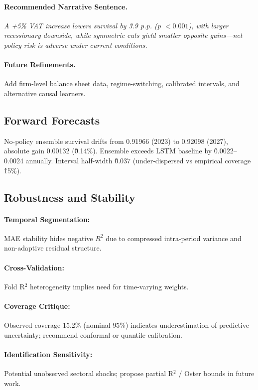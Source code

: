 \paragraph{Recommended Narrative Sentence.} \textit{A +5\% VAT increase lowers survival by \~3.9 p.p. (p $<0.001$), with larger recessionary downside, while symmetric cuts yield smaller opposite gains—net policy risk is adverse under current conditions.}

\paragraph{Future Refinements.} Add firm-level balance sheet data, regime-switching, calibrated intervals, and alternative causal learners.


\subsection{Forward Forecasts}
No-policy ensemble survival drifts from 0.91966 (2023) to 0.92098 (2027), absolute gain 0.00132 (\~0.14\%). Ensemble exceeds LSTM baseline by \~0.0022--0.0024 annually. Interval half-width \~0.037 (under-dispersed vs empirical coverage \~15\%).

\subsection{Robustness and Stability}
\paragraph{Temporal Segmentation:} MAE stability hides negative $R^2$ due to compressed intra-period variance and non-adaptive residual structure.
\paragraph{Cross-Validation:} Fold R$^2$ heterogeneity implies need for time-varying weights.
\paragraph{Coverage Critique:} Observed coverage 15.2\% (nominal 95\%) indicates underestimation of predictive uncertainty; recommend conformal or quantile calibration.
\paragraph{Identification Sensitivity:} Potential unobserved sectoral shocks; propose partial R$^2$ / Oster bounds in future work.

